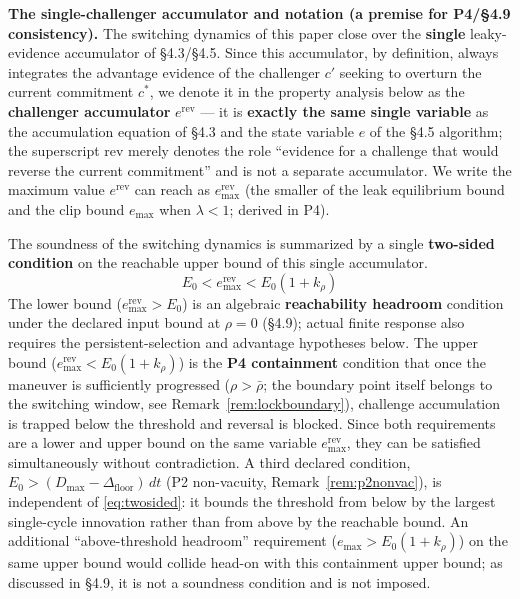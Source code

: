 \documentclass[11pt]{article}
\newcommand{\Dfloor}{\Delta_{\text{floor}}}
\newcommand{\Erev}{e^{\text{rev}}}
\newcommand{\Eremax}{e^{\text{rev}}_{\max}}
\begin{document}
\textbf{The single-challenger accumulator and notation (a premise for P4/\S4.9 consistency).} The switching dynamics of this paper close over the \textbf{single} leaky-evidence accumulator of \S4.3/\S4.5. Since this accumulator, by definition, always integrates the advantage evidence of the challenger $c'$ seeking to overturn the current commitment $c^*$, we denote it in the property analysis below as the \textbf{challenger accumulator} $\Erev$ --- it is \textbf{exactly the same single variable} as the accumulation equation of \S4.3 and the state variable $e$ of the \S4.5 algorithm; the superscript rev merely denotes the role ``evidence for a challenge that would reverse the current commitment'' and is not a separate accumulator. We write the maximum value $\Erev$ can reach as $\Eremax$ (the smaller of the leak equilibrium bound and the clip bound $e_{\max}$ when $\lambda < 1$; derived in P4).

The soundness of the switching dynamics is summarized by a single \textbf{two-sided condition} on the reachable upper bound of this single accumulator.
\begin{equation}
E_0 < \Eremax < E_0(1 + k_\rho)
\label{eq:twosided}
\end{equation}
The lower bound ($\Eremax > E_0$) is an algebraic \textbf{reachability headroom} condition under the declared input bound at $\rho = 0$ (\S4.9); actual finite response also requires the persistent-selection and advantage hypotheses below. The upper bound ($\Eremax < E_0(1+k_\rho)$) is the \textbf{P4 containment} condition that once the maneuver is sufficiently progressed ($\rho > \bar\rho$; the boundary point itself belongs to the switching window, see Remark~\ref{rem:lockboundary}), challenge accumulation is trapped below the threshold and reversal is blocked. Since both requirements are a lower and upper bound on the same variable $\Eremax$, they can be satisfied simultaneously without contradiction. A third declared condition, $E_0 > (D_{\max}-\Dfloor)\,dt$ (P2 non-vacuity, Remark~\ref{rem:p2nonvac}), is independent of \eqref{eq:twosided}: it bounds the threshold from below by the largest single-cycle innovation rather than from above by the reachable bound. An additional ``above-threshold headroom'' requirement ($e_{\max} > E_0(1+k_\rho)$) on the same upper bound would collide head-on with this containment upper bound; as discussed in \S4.9, it is not a soundness condition and is not imposed.
\end{document}
